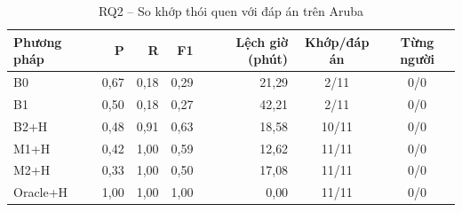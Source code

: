 \begin{table}[htbp]
\centering
\caption{RQ2 -- So khớp thói quen với đáp án trên Aruba}
\label{tab:rq2-aruba}
\small
\begin{tabular}{lrrrrcc}
\toprule
Phương pháp & P & R & F1 & Lệch giờ (phút) & Khớp/đáp án & Từng người \\
\midrule
B0 & 0{,}67 & 0{,}18 & 0{,}29 & 21{,}29 & 2/11 & 0/0 \\
B1 & 0{,}50 & 0{,}18 & 0{,}27 & 42{,}21 & 2/11 & 0/0 \\
B2+H & 0{,}48 & 0{,}91 & 0{,}63 & 18{,}58 & 10/11 & 0/0 \\
M1+H & 0{,}42 & 1{,}00 & 0{,}59 & 12{,}62 & 11/11 & 0/0 \\
M2+H & 0{,}33 & 1{,}00 & 0{,}50 & 17{,}08 & 11/11 & 0/0 \\
Oracle+H & 1{,}00 & 1{,}00 & 1{,}00 & 0{,}00 & 11/11 & 0/0 \\
\bottomrule
\end{tabular}
\end{table}
